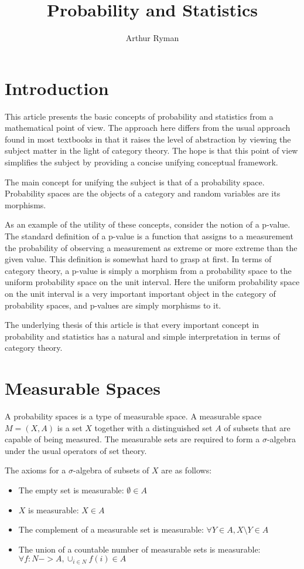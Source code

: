 \documentclass[11pt]{amsart}
\title{Probability and Statistics}
\author{Arthur Ryman}
\begin{document}
\maketitle
\section{Introduction}

This article presents the basic concepts of probability and statistics from a mathematical point of view.
The approach here differs from the usual approach found in most textbooks in that it raises the level
of abstraction by viewing the subject matter in the light of category theory. 
The hope is that this point of view simplifies the subject by providing a concise unifying conceptual framework.

The main concept for unifying the subject is that of a probability space. 
Probability spaces are the objects of a category and random variables are its morphisms.

As an example of the utility of these concepts, consider the notion of a p-value.
The standard definition of a p-value is a function that assigns to a measurement the probability of observing a measurement as extreme or more extreme than the given value.
This definition is somewhat hard to grasp at first.
In terms of category theory, a p-value is simply a morphism from a probability space to the uniform probability space on the unit interval.
Here the uniform probability space on the unit interval is a very important important object in the category of probability spaces, and p-values are simply morphisms to it.

The underlying thesis of this article is that every important concept in probability and statistics has a natural and simple interpretation in terms of  category theory.

\section{Measurable Spaces}

A probability spaces is a type of measurable space.
A measurable space $M =(X,A)$ is a set $X$ together with a distinguished set $A$ of subsets that are capable of being measured.
The measurable sets are required to form a $\sigma$-algebra under the usual operators of set theory.

The axioms for a $\sigma$-algebra of subsets of $X$ are as follows:
\begin{itemize}
\item The empty set is measurable: $\emptyset \in A$
\item $X$ is measurable: $X \in A$
\item The complement of a measurable set is measurable: $\forall Y \in A, X \setminus Y \in A$
\item The union of a countable number of measurable sets is measurable: $\forall f: N -> A, \cup_{i \in N} f(i) \in A$
\end{itemize}
\end{document}
